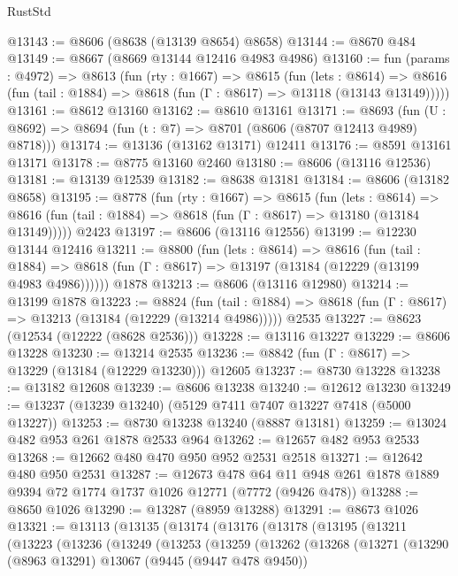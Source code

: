 \begin{lexlean}{RustStd}
\begin{coremodule}
@13143 := @8606 (@8638 (@13139 @8654) @8658)
@13144 := @8670 @484
@13149 := @8667 (@8669 @13144 @12416 @4983 @4986)
@13160 := fun (params : @4972) =>
  @8613
    (fun (rty : @1667) =>
    @8615
      (fun (lets : @8614) =>
      @8616 (fun (tail : @1884) => @8618 (fun (Γ : @8617) => @13118 (@13143 @13149)))))
@13161 := @8612 @13160
@13162 := @8610 @13161
@13171 := @8693
    (fun (U : @8692) => @8694 (fun (t : @7) => @8701 (@8606 (@8707 @12413 @4989) @8718)))
@13174 := @13136 (@13162 @13171) @12411
@13176 := @8591 @13161 @13171
@13178 := @8775 @13160 @2460
@13180 := @8606 (@13116 @12536)
@13181 := @13139 @12539
@13182 := @8638 @13181
@13184 := @8606 (@13182 @8658)
@13195 := @8778
    (fun (rty : @1667) =>
    @8615
      (fun (lets : @8614) =>
      @8616 (fun (tail : @1884) => @8618 (fun (Γ : @8617) => @13180 (@13184 @13149)))))
    @2423
@13197 := @8606 (@13116 @12556)
@13199 := @12230 @13144 @12416
@13211 := @8800
    (fun (lets : @8614) =>
    @8616
      (fun (tail : @1884) =>
      @8618 (fun (Γ : @8617) => @13197 (@13184 (@12229 (@13199 @4983 @4986))))))
    @1878
@13213 := @8606 (@13116 @12980)
@13214 := @13199 @1878
@13223 := @8824
    (fun (tail : @1884) => @8618 (fun (Γ : @8617) => @13213 (@13184 (@12229 (@13214 @4986)))))
    @2535
@13227 := @8623 (@12534 (@12222 (@8628 @2536)))
@13228 := @13116 @13227
@13229 := @8606 @13228
@13230 := @13214 @2535
@13236 := @8842 (fun (Γ : @8617) => @13229 (@13184 (@12229 @13230))) @12605
@13237 := @8730 @13228
@13238 := @13182 @12608
@13239 := @8606 @13238
@13240 := @12612 @13230
@13249 := @13237 (@13239 @13240) (@5129 @7411 @7407 @13227 @7418 (@5000 @13227))
@13253 := @8730 @13238 @13240 (@8887 @13181)
@13259 := @13024 @482 @953 @261 @1878 @2533 @964
@13262 := @12657 @482 @953 @2533
@13268 := @12662 @480 @470 @950 @952 @2531 @2518
@13271 := @12642 @480 @950 @2531
@13287 := @12673
    @478
    @64
    @11
    @948
    @261
    @1878
    @1889
    @9394
    @72
    @1774
    @1737
    @1026
    @12771
    (@7772 (@9426 @478))
@13288 := @8650 @1026
@13290 := @13287 (@8959 @13288)
@13291 := @8673 @1026
@13321 := @13113
    (@13135
      (@13174
        (@13176
          (@13178
            (@13195
              (@13211
                (@13223
                  (@13236
                    (@13249
                      (@13253
                        (@13259
                          (@13262
                            (@13268
                              (@13271
                                (@13290
                                  (@8963 @13291)
                                  @13067
                                  (@9445 (@9447 @478 @9450))

\end{coremodule}
\end{lexlean}
